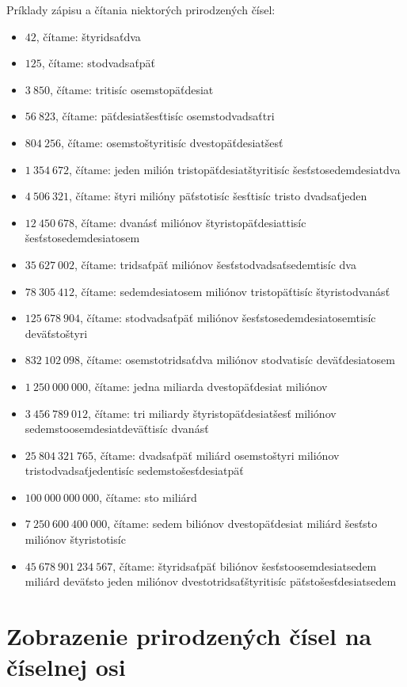 \documentclass{article}
\begin{document}
Príklady zápisu a čítania niektorých prirodzených čísel:
\begin{itemize}
  \item \(42\), čítame: štyridsaťdva
  \item \(125\), čítame: stodvadsaťpäť
  \item \(3\ 850\), čítame: tritisíc osemstopäťdesiat
  \item \(56\ 823\), čítame: päťdesiatšesťtisíc osemstodvadsaťtri
  \item \(804\ 256\), čítame: osemstoštyritisíc dvestopäťdesiatšesť
  \item \(1\ 354\ 672\), čítame: jeden milión tristopäťdesiatštyritisíc šesťstosedemdesiatdva
  \item \(4\ 506\ 321\), čítame: štyri milióny päťstotisíc šesťtisíc tristo dvadsaťjeden
  \item \(12\ 450\ 678\), čítame: dvanásť miliónov štyristopäťdesiattisíc šesťstosedemdesiatosem
  \item \(35\ 627\ 002\), čítame: tridsaťpäť miliónov šesťstodvadsaťsedemtisíc dva
  \item \(78\ 305\ 412\), čítame: sedemdesiatosem miliónov tristopäťtisíc štyristodvanásť
  \item \(125\ 678\ 904\), čítame: stodvadsaťpäť miliónov šesťstosedemdesiatosemtisíc deväťstoštyri
  \item \(832\ 102\ 098\), čítame: osemstotridsaťdva miliónov stodvatisíc deväťdesiatosem
  \item \(1\ 250\ 000\ 000\), čítame: jedna miliarda dvestopäťdesiat miliónov
  \item \(3\ 456\ 789\ 012\), čítame: tri miliardy štyristopäťdesiatšesť miliónov sedemstoosemdesiatdeväťtisíc dvanásť
  \item \(25\ 804\ 321\ 765\), čítame: dvadsaťpäť miliárd osemstoštyri miliónov tristodvadsaťjedentisíc sedemstošesťdesiatpäť
  \item \(100\ 000\ 000\ 000\), čítame: sto miliárd
  \item \(7\ 250\ 600\ 400\ 000\), čítame: sedem biliónov dvestopäťdesiat miliárd šesťsto miliónov štyristotisíc
  \item \(45\ 678\ 901\ 234\ 567\), čítame: štyridsaťpäť biliónov šesťstoosemdesiatsedem miliárd deväťsto jeden miliónov dvestotridsaťštyritisíc päťstošesťdesiatsedem
\end{itemize}

\section{Zobrazenie prirodzených čísel na číselnej osi}
\end{document}
